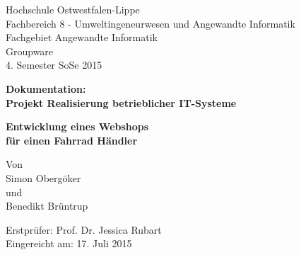 
\begin{titlepage}
Hochschule Ostwestfalen-Lippe \\
Fachbereich 8 - Umweltingeneurwesen und Angewandte Informatik \\
Fachgebiet Angewandte Informatik \\
Groupware \\
4. Semester SoSe 2015\\
\vspace{2cm}

\begin{center}
\begin{Large}
\textbf{Dokumentation: \\Projekt Realisierung betrieblicher IT-Systeme } \\
\end{Large}
\vspace{2cm}

\begin{Large}
\textbf {Entwicklung eines Webshops\\ für einen Fahrrad Händler} \\[0.35cm]
\end{Large}
\vspace{5mm}
Von \\[0.25cm]
Simon Obergöker \\[0.25cm]
und\\[0.25cm]
Benedikt Brüntrup \\
\end{center}

\vfill
Erstprüfer: Prof. Dr. Jessica Rubart  \\
Eingereicht am: 17. Juli 2015

\end{titlepage}